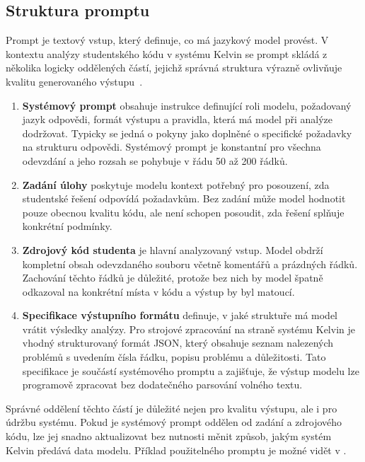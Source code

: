 \subsection{Struktura promptu}
\label{subsec:prompts-structure}

Prompt je textový vstup, který definuje, co má jazykový model provést.
V kontextu analýzy studentského kódu v systému Kelvin se prompt skládá z několika logicky oddělených částí, jejichž správná struktura výrazně ovlivňuje kvalitu generovaného výstupu~\cite{white-prompt}.

\begin{enumerate}
    \item \textbf{Systémový prompt} obsahuje instrukce definující roli modelu, požadovaný jazyk odpovědi, formát výstupu a pravidla, která má model při analýze dodržovat.
    Typicky se jedná o pokyny jako  doplněné o specifické požadavky na strukturu odpovědi.
    Systémový prompt je konstantní pro všechna odevzdání a jeho rozsah se pohybuje v řádu 50 až 200 řádků.

    \item \textbf{Zadání úlohy} poskytuje modelu kontext potřebný pro posouzení, zda studentské řešení odpovídá požadavkům.
    Bez zadání může model hodnotit pouze obecnou kvalitu kódu, ale není schopen posoudit, zda řešení splňuje konkrétní podmínky.

    \item \textbf{Zdrojový kód studenta} je hlavní analyzovaný vstup.
    Model obdrží kompletní obsah odevzdaného souboru včetně komentářů a prázdných řádků.
    Zachování těchto řádků je důležité, protože bez nich by model špatně odkazoval na konkrétní místa v kódu a výstup by byl matoucí.

    \item \textbf{Specifikace výstupního formátu} definuje, v jaké struktuře má model vrátit výsledky analýzy.
    Pro strojové zpracování na straně systému Kelvin je vhodný strukturovaný formát JSON, který obsahuje seznam nalezených problémů s uvedením čísla řádku, popisu problému a důležitosti.
    Tato specifikace je součástí systémového promptu a zajišťuje, že výstup modelu lze programově zpracovat bez dodatečného parsování volného textu.
\end{enumerate}

Správné oddělení těchto částí je důležité nejen pro kvalitu výstupu, ale i pro údržbu systému.
Pokud je systémový prompt oddělen od zadání a zdrojového kódu, lze jej snadno aktualizovat bez nutnosti měnit způsob, jakým systém Kelvin předává data modelu.
Příklad použitelného promptu je možné vidět v .

\endinput